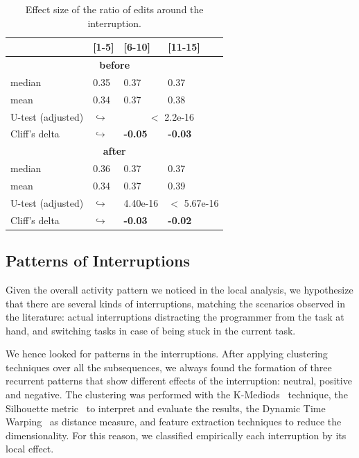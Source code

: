\documentclass[times]{smrauth}
\begin{document}
\begin{table}[ht!]
\tiny
\renewcommand{\arraystretch}{1.3}
\caption{Effect size of the ratio of edits around the interruption.}
\label{tbl:ratio_all}
\centering
\begin{tabular}{l | p{0.7cm} | p{1.9cm} | p{1.9cm} } 
   & [1-5] & [6-10] & [11-15] \\  
  \hline
  \multicolumn{4}{c}{\textbf{before}} \\
  \hline
  median & 0.35 & 0.37 & 0.37 \\
  \cline{2-4} 
  mean & 0.34 &	0.37 &	0.38 \\ 
   \cline{3-4} 
  U-test (adjusted) & $\hookrightarrow$ & \multicolumn{2}{c}{$<$ 2.2e-16}  \\

  \cline{3-4} 
   Cliff's delta & $\hookrightarrow$	& \textbf{-0.05} & \textbf{-0.03}   \\
  \hline
  
  
  \multicolumn{4}{c}{\textbf{after}} \\
  \hline 
  median & 0.36 & 0.37 & 0.37 \\
  \cline{2-4} 
  mean & 0.34 &	0.37 &	0.39 \\ 
   \cline{3-4} 
  U-test (adjusted) & $\hookrightarrow$ & 4.40e-16 & $<$ 5.67e-16 \\  
  \cline{3-4} 
  Cliff's delta & $\hookrightarrow$	& \textbf{-0.03} & \textbf{-0.02}  \\  
\end{tabular}
\end{table}

\subsection{Patterns of Interruptions}
Given the overall activity pattern we noticed in the local analysis, we hypothesize that there are several kinds of interruptions, matching the scenarios observed in the literature: actual interruptions distracting the programmer from the task at hand, and switching tasks in case of being stuck in the current task.

We hence looked for patterns in the interruptions.  After applying clustering techniques over all the subsequences, we always found the formation of three recurrent patterns that show different effects of the interruption: neutral, positive and negative. The clustering was performed with the  K-Mediods~\cite{AMP97} technique, the Silhouette metric~\cite{RP87} to interpret and evaluate the results, the Dynamic Time Warping~\cite{KE05} as distance measure, and feature extraction techniques to reduce the dimensionality.  For this reason, we classified empirically each interruption by its local effect. 
\end{document}
